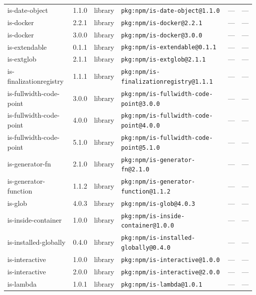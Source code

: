 \documentclass[11pt,a4paper]{article}
\begin{document}
\begin{longtable}{|p{4cm}|p{2cm}|p{1.6cm}|p{5cm}|p{1.5cm}|p{3.5cm}|}
\raggedright is-date-object & 1.1.0 & library & \small\texttt{pkg:npm/is-date-object@1.1.0} & — & \small — \\
\raggedright is-docker & 2.2.1 & library & \small\texttt{pkg:npm/is-docker@2.2.1} & — & \small — \\
\raggedright is-docker & 3.0.0 & library & \small\texttt{pkg:npm/is-docker@3.0.0} & — & \small — \\
\raggedright is-extendable & 0.1.1 & library & \small\texttt{pkg:npm/is-extendable@0.1.1} & — & \small — \\
\raggedright is-extglob & 2.1.1 & library & \small\texttt{pkg:npm/is-extglob@2.1.1} & — & \small — \\
\raggedright is-finalizationregistry & 1.1.1 & library & \small\texttt{pkg:npm/is-finalizationregistry@1.1.1} & — & \small — \\
\raggedright is-fullwidth-code-point & 3.0.0 & library & \small\texttt{pkg:npm/is-fullwidth-code-point@3.0.0} & — & \small — \\
\raggedright is-fullwidth-code-point & 4.0.0 & library & \small\texttt{pkg:npm/is-fullwidth-code-point@4.0.0} & — & \small — \\
\raggedright is-fullwidth-code-point & 5.1.0 & library & \small\texttt{pkg:npm/is-fullwidth-code-point@5.1.0} & — & \small — \\
\raggedright is-generator-fn & 2.1.0 & library & \small\texttt{pkg:npm/is-generator-fn@2.1.0} & — & \small — \\
\raggedright is-generator-function & 1.1.2 & library & \small\texttt{pkg:npm/is-generator-function@1.1.2} & — & \small — \\
\raggedright is-glob & 4.0.3 & library & \small\texttt{pkg:npm/is-glob@4.0.3} & — & \small — \\
\raggedright is-inside-container & 1.0.0 & library & \small\texttt{pkg:npm/is-inside-container@1.0.0} & — & \small — \\
\raggedright is-installed-globally & 0.4.0 & library & \small\texttt{pkg:npm/is-installed-globally@0.4.0} & — & \small — \\
\raggedright is-interactive & 1.0.0 & library & \small\texttt{pkg:npm/is-interactive@1.0.0} & — & \small — \\
\raggedright is-interactive & 2.0.0 & library & \small\texttt{pkg:npm/is-interactive@2.0.0} & — & \small — \\
\raggedright is-lambda & 1.0.1 & library & \small\texttt{pkg:npm/is-lambda@1.0.1} & — & \small — \\

\end{longtable}
\end{document}
